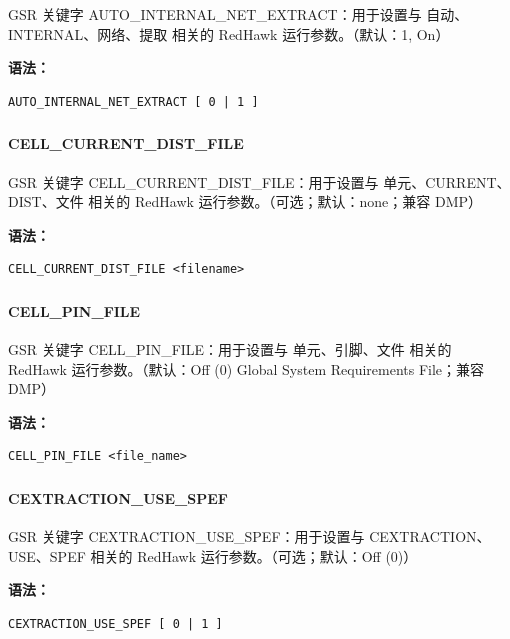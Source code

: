 GSR 关键字 AUTO_INTERNAL_NET_EXTRACT：用于设置与 自动、INTERNAL、网络、提取 相关的 RedHawk 运行参数。（默认：1, On）

\textbf{语法：}
\begin{lstlisting}
AUTO_INTERNAL_NET_EXTRACT [ 0 | 1 ]
\end{lstlisting}

\subsubsection{}
\paragraph*{CELL_CURRENT_DIST_FILE}

GSR 关键字 CELL_CURRENT_DIST_FILE：用于设置与 单元、CURRENT、DIST、文件 相关的 RedHawk 运行参数。（可选；默认：none；兼容 DMP）

\textbf{语法：}
\begin{lstlisting}
CELL_CURRENT_DIST_FILE <filename>
\end{lstlisting}

\subsubsection{}
\paragraph*{CELL_PIN_FILE}

GSR 关键字 CELL_PIN_FILE：用于设置与 单元、引脚、文件 相关的 RedHawk 运行参数。（默认：Off (0) Global System Requirements File；兼容 DMP）

\textbf{语法：}
\begin{lstlisting}
CELL_PIN_FILE <file_name>
\end{lstlisting}

\subsubsection{}
\paragraph*{CEXTRACTION_USE_SPEF}

GSR 关键字 CEXTRACTION_USE_SPEF：用于设置与 CEXTRACTION、USE、SPEF 相关的 RedHawk 运行参数。（可选；默认：Off (0)）

\textbf{语法：}
\begin{lstlisting}
CEXTRACTION_USE_SPEF [ 0 | 1 ]
\end{lstlisting}

